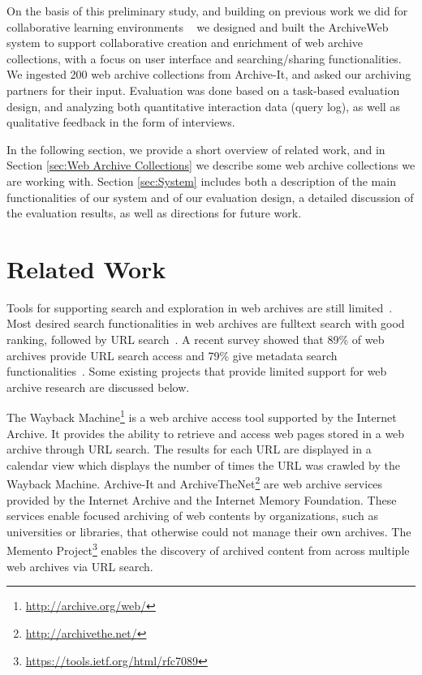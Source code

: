 \documentclass{llncs}
\begin{document}
On the basis of this preliminary study, and building on previous work
we did for collaborative learning environments ~\cite{Abel09,Marenzi2010,marenzi12,tlt12,oro42050} we
designed and built the ArchiveWeb system to support collaborative
creation and enrichment of web archive collections, with a focus on
user interface and searching/sharing functionalities. We ingested 200
web archive collections from Archive-It, and asked our archiving
partners for their input. Evaluation was done based on a task-based
evaluation design, and analyzing both quantitative interaction data
(query log), as well as qualitative feedback in the form of
interviews.

In the following section, we provide a short overview of related work,
and in Section \ref{sec:Web Archive Collections} we describe some web
archive collections we are working with. Section \ref{sec:System}
includes both a description of the main functionalities of our system
and of our evaluation design, a detailed discussion of the evaluation
results, as well as directions for future work.

\section{Related Work}\label{sec:Related Work}

Tools for supporting search and exploration in web archives are still
limited~\cite{dougherty09}. Most desired search functionalities in web
archives are fulltext search with good ranking, followed by URL
search~\cite{archiving07}. A recent survey showed that 89\% of web
archives provide URL search access and 79\% give metadata search
functionalities~\cite{gomes11}. Some existing projects that provide
limited support for web archive research are discussed below.

The Wayback Machine\footnote{\url{http://archive.org/web/}} is a web archive
access tool supported by the Internet Archive. It provides the ability
to retrieve and access web pages stored in a web archive through URL
search. The results for each URL are displayed in a calendar view
which displays the number of times the URL was crawled by the Wayback
Machine. Archive-It and ArchiveTheNet\footnote{\url{http://archivethe.net/}} are web
archive services provided by the Internet Archive and the Internet
Memory Foundation. These services enable focused archiving of web
contents by organizations, such as universities or libraries, that
otherwise could not manage their own archives.  
The Memento Project\footnote{\url{https://tools.ietf.org/html/rfc7089}} enables
the discovery of archived content from across multiple web archives
via URL search.
\end{document}
